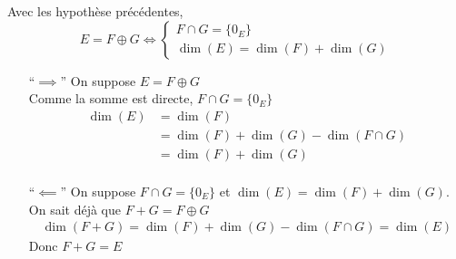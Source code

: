 \begin{crlr}
	Avec les hypothèse précédentes, \[
		E = F \oplus G \iff \begin{cases}
			F \cap  G = \{0_E\} \\
			\dim(E) = \dim(F) + \dim(G)
		\end{cases}
	\] 
\end{crlr}

\begin{prv}
	\begin{itemize}
		\item[``$\implies$''] On suppose $E = F \oplus G$ \\
			Comme la somme est directe, $F \cap G = \{0_E\}$ 
			\begin{align*}
				\dim(E) &= \dim(F)\\
				&= \dim(F) + \dim(G) - \dim(F\cap G)\\
				&= \dim(F) + \dim(G)\\
			\end{align*}
		\item[``$\impliedby$''] On suppose $F\cap G = \{0_E\}$ et $\dim(E) = \dim(F) + \dim(G)$.\\
			On sait déjà que $F+G = F \oplus G$\\
			 \begin{align*}
				\dim(F+G) = \dim(F) + \dim(G) - \dim(F \cap G) = \dim(E)
			\end{align*}
			Donc $F + G = E$
	\end{itemize}
\end{prv}

